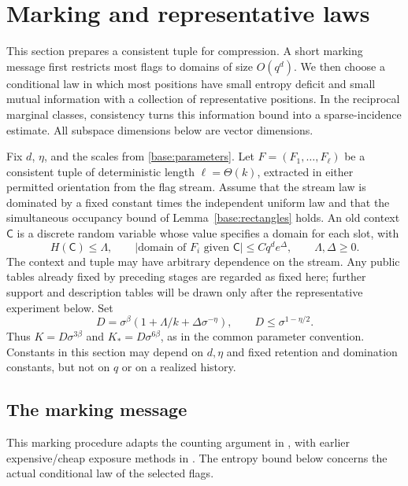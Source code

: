 \section{Marking and representative laws}\label{mark:section}

This section prepares a consistent tuple for compression. A short marking
message first restricts most flags to domains of size $O(q^d)$. We then
choose a conditional law in which most positions have small entropy
deficit and small mutual information with a collection of representative
positions. In the reciprocal marginal classes, consistency turns this
information bound into a sparse-incidence estimate. All subspace dimensions
below are vector dimensions.

Fix $d$, $\eta$, and the scales from \eqref{base:parameters}. Let
$F=(F_1,\ldots,F_\ell)$ be a consistent tuple of deterministic length
$\ell=\Theta(k)$, extracted in either permitted orientation from the flag
stream. Assume that the stream law is dominated by a fixed constant times
the independent uniform law and that the simultaneous occupancy bound of
Lemma~\ref{base:rectangles} holds. An old context $\mathsf C$ is a discrete
random variable whose value specifies a domain for each slot, with
\begin{equation}\label{mark:stage-budget}
 H(\mathsf C)\le\Lambda,\qquad
 |\text{domain of }F_i\text{ given }\mathsf C|
       \le Cq^d e^\Delta,\qquad \Lambda,\Delta\ge0.
\end{equation}
The context and tuple may have arbitrary dependence on the stream.
Any public tables already fixed by preceding stages are regarded as
fixed here; further support and description tables will be drawn only
after the representative experiment below. Set
\begin{equation}\label{mark:parameters}
 D=\sigma^\beta(1+\Lambda/k+\Delta\sigma^{-\eta}),
 \qquad D\le\sigma^{1-\eta/2}.
\end{equation}
Thus $K=D\sigma^{3\beta}$ and $K_*=D\sigma^{6\beta}$, as in the common
parameter convention. Constants in this section may depend on $d,\eta$
and fixed retention and domination constants, but not on $q$ or on a
realized history.

\subsection{The marking message}

This marking procedure adapts the counting argument in
\cite[Claim~2.13]{Bradac2026}, with earlier expensive/cheap exposure
methods in \cite{AlonRodl2005}. The entropy bound below concerns the
actual conditional law of the selected flags.

